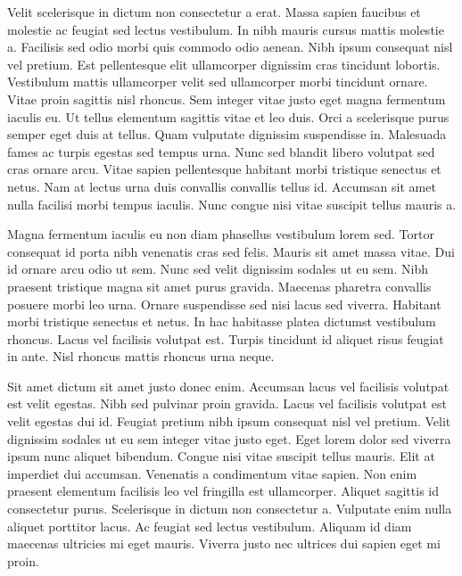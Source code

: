 \documentclass[11pt,a4paper]{article}
\begin{document}
Velit scelerisque in dictum non consectetur a erat. Massa sapien faucibus et molestie ac feugiat sed lectus vestibulum. In nibh mauris cursus mattis molestie a. Facilisis sed odio morbi quis commodo odio aenean. Nibh ipsum consequat nisl vel pretium. Est pellentesque elit ullamcorper dignissim cras tincidunt lobortis. Vestibulum mattis ullamcorper velit sed ullamcorper morbi tincidunt ornare. Vitae proin sagittis nisl rhoncus. Sem integer vitae justo eget magna fermentum iaculis eu. Ut tellus elementum sagittis vitae et leo duis. Orci a scelerisque purus semper eget duis at tellus. Quam vulputate dignissim suspendisse in. Malesuada fames ac turpis egestas sed tempus urna. Nunc sed blandit libero volutpat sed cras ornare arcu. Vitae sapien pellentesque habitant morbi tristique senectus et netus. Nam at lectus urna duis convallis convallis tellus id. Accumsan sit amet nulla facilisi morbi tempus iaculis. Nunc congue nisi vitae suscipit tellus mauris a.

Magna fermentum iaculis eu non diam phasellus vestibulum lorem sed. Tortor consequat id porta nibh venenatis cras sed felis. Mauris sit amet massa vitae. Dui id ornare arcu odio ut sem. Nunc sed velit dignissim sodales ut eu sem. Nibh praesent tristique magna sit amet purus gravida. Maecenas pharetra convallis posuere morbi leo urna. Ornare suspendisse sed nisi lacus sed viverra. Habitant morbi tristique senectus et netus. In hac habitasse platea dictumst vestibulum rhoncus. Lacus vel facilisis volutpat est. Turpis tincidunt id aliquet risus feugiat in ante. Nisl rhoncus mattis rhoncus urna neque.

Sit amet dictum sit amet justo donec enim. Accumsan lacus vel facilisis volutpat est velit egestas. Nibh sed pulvinar proin gravida. Lacus vel facilisis volutpat est velit egestas dui id. Feugiat pretium nibh ipsum consequat nisl vel pretium. Velit dignissim sodales ut eu sem integer vitae justo eget. Eget lorem dolor sed viverra ipsum nunc aliquet bibendum. Congue nisi vitae suscipit tellus mauris. Elit at imperdiet dui accumsan. Venenatis a condimentum vitae sapien. Non enim praesent elementum facilisis leo vel fringilla est ullamcorper. Aliquet sagittis id consectetur purus. Scelerisque in dictum non consectetur a. Vulputate enim nulla aliquet porttitor lacus. Ac feugiat sed lectus vestibulum. Aliquam id diam maecenas ultricies mi eget mauris. Viverra justo nec ultrices dui sapien eget mi proin.
\end{document}
